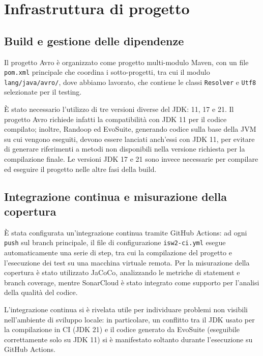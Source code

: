 \section{Infrastruttura di progetto}

\subsection{Build e gestione delle dipendenze}

Il progetto Avro è organizzato come progetto multi-modulo Maven, con un
file \texttt{pom.xml} principale che coordina i sotto-progetti, tra cui
il modulo \texttt{lang/java/avro/}, dove abbiamo lavorato, che contiene
le classi \texttt{Resolver} e \texttt{Utf8} selezionate per il testing.

È stato necessario l'utilizzo di tre versioni diverse del JDK: 11, 17 e
21. Il progetto Avro richiede infatti la compatibilità con JDK 11 per il
codice compilato; inoltre, Randoop ed EvoSuite, generando codice sulla
base della JVM su cui vengono eseguiti, devono essere lanciati anch'essi
con JDK 11, per evitare di generare riferimenti a metodi non disponibili
nella versione richiesta per la compilazione finale. Le versioni JDK 17
e 21 sono invece necessarie per compilare ed eseguire il progetto nelle
altre fasi della build.

\subsection{Integrazione continua e misurazione della copertura}

È stata configurata un'integrazione continua tramite GitHub Actions: ad
ogni \texttt{push} sul branch principale, il file di configurazione
\texttt{isw2-ci.yml} esegue automaticamente una serie di step, tra cui
la compilazione del progetto e l'esecuzione dei test su una macchina
virtuale remota. Per la misurazione della copertura è stato utilizzato
JaCoCo, analizzando le metriche di statement e branch coverage, mentre
SonarCloud è stato integrato come supporto per l'analisi della qualità
del codice.

L'integrazione continua si è rivelata utile per individuare problemi non
visibili nell'ambiente di sviluppo locale: in particolare, un conflitto
tra il JDK usato per la compilazione in CI (JDK 21) e il codice generato
da EvoSuite (eseguibile correttamente solo su JDK 11) si è manifestato
soltanto durante l'esecuzione su GitHub Actions.

